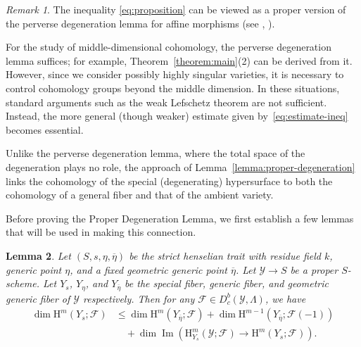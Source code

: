 \documentclass[english]{smfart}
\renewcommand{\leq}{\leqslant}
\theoremstyle{remark}
\newtheorem{remark}{Remark}[subsection]
\theoremstyle{plain}
\newtheorem{lemma}[remark]{Lemma}
\theoremstyle{definition}
\numberwithin{equation}{remark}
\theoremstyle{void}
\begin{document}
\begin{remark}
The inequality \eqref{eq:proposition} can be viewed as a proper
version of the perverse degeneration lemma for affine morphisms (see
\cite[Proposition~9]{katz_perverse-origin},
\cite[Lemma~3.1]{wan-zhang_betti-number-bounds-for-varieties-and-exponential-sums0}).

For the study of middle-dimensional cohomology, the perverse
degeneration lemma suffices; for example,
Theorem~\ref{theorem:main}(2) can be derived from it.  However, since
we consider possibly highly singular varieties, it is necessary to
control cohomology groups beyond the middle dimension.  In these
situations, standard arguments such as the weak Lefschetz theorem are
not sufficient.  Instead, the more general (though weaker) estimate
given by~\eqref{eq:estimate-ineq} becomes essential.

Unlike the perverse degeneration lemma, where the total space of the
degeneration plays no role, the approach of
Lemma~\ref{lemma:proper-degeneration} links the cohomology of the
special (degenerating) hypersurface to both the cohomology of a
general fiber and that of the ambient variety.
\end{remark}

Before proving the Proper Degeneration Lemma,
we first establish a few lemmas that will be used in making this
connection.

\begin{lemma}%
\label{lemma:local-situation-estimate}
Let \((S,s,\eta,\overline{\eta})\) be the strict henselian trait with
residue field \(k\), generic point \(\eta\), and a fixed geometric
generic point \(\overline{\eta}\).  Let \(\mathcal{Y} \to S\) be a
proper \(S\)-scheme.  Let \(Y_s\), \(Y_{\eta}\), and
\(Y_{\overline{\eta}}\) be the special fiber, generic fiber, and
geometric generic fiber of \(\mathcal{Y}\) respectively. Then for any
\(\mathcal{F} \in D^b_c(\mathcal{Y},\Lambda)\), we have
\begin{align*}
\dim \mathrm{H}^m(Y_s;\mathcal{F}) &\leq
\dim \mathrm{H}^m(Y_{\overline{\eta}};\mathcal{F}) + \dim \mathrm{H}^{m-1}(Y_{\overline{\eta}};\mathcal{F}(-1)) \\
 &\quad  + \dim \operatorname{Im}(\mathrm{H}^m_{Y_s}(\mathcal{Y};\mathcal{F}) \to \mathrm{H}^m(Y_s;\mathcal{F})).
\end{align*}
\end{lemma}
\end{document}
